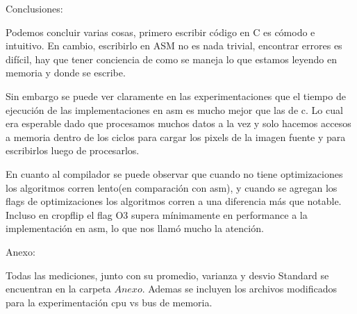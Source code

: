 \documentclass[a4paper]{article}
\begin{document}
\newpage

{\noindent \Huge Conclusiones:}


Podemos concluir varias cosas, primero escribir código en C es cómodo e intuitivo. En cambio, escribirlo en ASM no es nada trivial, encontrar errores es difícil, hay que tener conciencia de como se maneja lo que estamos leyendo en memoria y donde se escribe.

Sin embargo se puede ver claramente en las experimentaciones  que el tiempo de ejecución de las implementaciones en asm es mucho mejor que las de c.
Lo cual era esperable dado que procesamos muchos datos a la vez y solo hacemos accesos a memoria dentro de
los ciclos para cargar los pixels de la imagen fuente y para escribirlos luego de procesarlos.

En cuanto al compilador se puede observar que cuando no tiene optimizaciones los algoritmos corren lento(en comparación con asm), y cuando se agregan los flags de optimizaciones los algoritmos corren a una diferencia más que notable. \newline
Incluso en cropflip el flag O3 supera mínimamente en performance a la implementación en asm, lo que nos llamó mucho la atención. 

\newpage

{\noindent \Huge Anexo:}
\newline \newline

Todas las mediciones, junto con su promedio, varianza y desvio Standard se encuentran en la carpeta $Anexo$. Ademas se incluyen los archivos modificados para la experimentación cpu vs bus de memoria.
\end{document}
